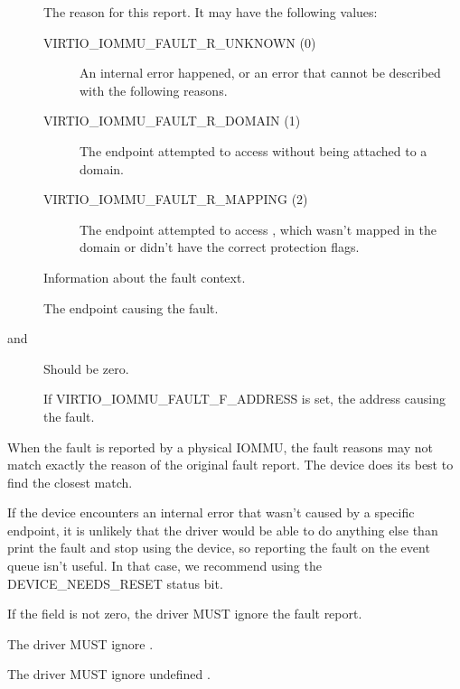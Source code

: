 \begin{description}
  \item[] The reason for this report. It may have the
    following values:
    \begin{description}
      \item[VIRTIO_IOMMU_FAULT_R_UNKNOWN (0)] An internal error happened, or
        an error that cannot be described with the following reasons.
      \item[VIRTIO_IOMMU_FAULT_R_DOMAIN (1)] The endpoint attempted to
        access  without being attached to a domain.
      \item[VIRTIO_IOMMU_FAULT_R_MAPPING (2)] The endpoint attempted to
        access , which wasn't mapped in the domain or
        didn't have the correct protection flags.
    \end{description}
  \item[] Information about the fault context.
  \item[] The endpoint causing the fault.
  \item[ and ] Should be zero.
  \item[] If VIRTIO_IOMMU_FAULT_F_ADDRESS is set, the
    address causing the fault.
\end{description}

When the fault is reported by a physical IOMMU, the fault reasons may not
match exactly the reason of the original fault report. The device does its
best to find the closest match.

If the device encounters an internal error that wasn't caused by a
specific endpoint, it is unlikely that the driver would be able to do
anything else than print the fault and stop using the device, so reporting
the fault on the event queue isn't useful. In that case, we recommend
using the DEVICE_NEEDS_RESET status bit.


If the  field is not zero, the driver MUST ignore the
fault report.

The driver MUST ignore .

The driver MUST ignore undefined .

